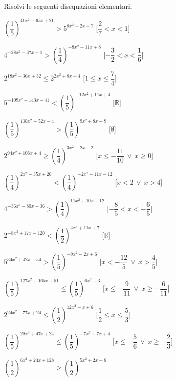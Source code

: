 \begin{esercizio}\label{ese:}
 Risolvi le seguenti disequazioni elementari.
 \begin{enumeratea}
  \item  \(\left(\dfrac{1}{5}\right)^{41 x^2 -65 x +21} > 
5^{8 x^2 +2 x -7}\)
   \hfill [\(\dfrac{2}{7} < x < 1\)]
  \item  \(4^{-28 x^2 -37 x +1} > 
\left(\dfrac{1}{4}\right)^{-8 x^2 -11 x +8}\)
   \hfill [\(-\dfrac{3}{2} < x < \dfrac{1}{6}\)]
  \item  \(2^{18 x^2 -36 x +32} \leqslant 2^{2 x^2 +8 x +4}\)
   \hfill [\(1 \leqslant x \leqslant \dfrac{7}{4}\)]
  \item  \(5^{-109 x^2 -143 x -41} < 
\left(\dfrac{1}{5}\right)^{-12 x^2 +11 x +4}\)
   \hfill [\(\mathbb{R}\)]
  \item  \(\left(\dfrac{1}{5}\right)^{130 x^2 +52 x -4} > 
\left(\dfrac{1}{5}\right)^{9 x^2 +8 x -9}\)
   \hfill [\(\emptyset\)]
  \item  \(2^{94 x^2 +106 x +4} \geqslant \left(\dfrac{1}{4}\right)^{3 x^2 
+2 x -2}\)
   \hfill [\(x \leqslant -\dfrac{11}{10}~\vee~x \geqslant 0\)]
  \item  \(\left(\dfrac{1}{4}\right)^{2 x^2 -35 x +20} < 
\left(\dfrac{1}{4}\right)^{-2 x^2 -11 x -12}\)
   \hfill [\(x < 2~\vee~x > 4\)]
  \item  \(4^{-36 x^2 -80 x -36} > 
\left(\dfrac{1}{4}\right)^{11 x^2 +10 x -12}\)
   \hfill [\(-\dfrac{8}{5} < x < -\dfrac{6}{5}\)]
  \item  \(2^{-8 x^2 +17 x -120} < 
\left(\dfrac{1}{2}\right)^{4 x^2 +11 x +7}\)
   \hfill [\(\mathbb{R}\)]
  \item  \(5^{34 x^2 +42 x -54} > \left(\dfrac{1}{5}\right)^{-9 x^2 -2 x 
+6}\)
   \hfill [\(x < -\dfrac{12}{5}~\vee~x > \dfrac{4}{5}\)]
  \item  \(\left(\dfrac{1}{5}\right)^{127 x^2 +165 x +51} \leqslant 
\left(\dfrac{1}{5}\right)^{6 x^2 -3}\)
   \hfill [\(x \leqslant -\dfrac{9}{11}~\vee~x \geqslant -\dfrac{6}{11}\)]
  \item  \(2^{24 x^2 -77 x +24} \leqslant \left(\dfrac{1}{2}\right)^{12 x^2 
- x +6}\)
   \hfill [\(\dfrac{1}{2} \leqslant x \leqslant \dfrac{5}{3}\)]
  \item  \(\left(\dfrac{1}{5}\right)^{29 x^2 +47 x +24} \leqslant 
\left(\dfrac{1}{5}\right)^{-7 x^2 -7 x +4}\)
   \hfill [\(x \leqslant -\dfrac{5}{6}~\vee~x \geqslant -\dfrac{2}{3}\)]
  \item  \(\left(\dfrac{1}{2}\right)^{6 x^2 +24 x +128} \geqslant 
\left(\dfrac{1}{2}\right)^{5 x^2 +2 x +8}\)

\end{enumeratea}
\end{esercizio}
